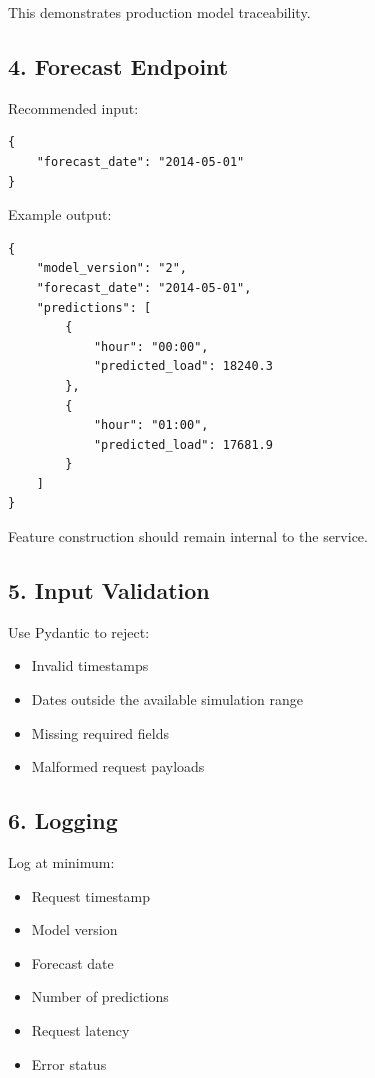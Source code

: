 \documentclass[11pt,a4paper]{article}
\begin{document}
This demonstrates production model traceability.

\subsection{4. Forecast Endpoint}

Recommended input:

\begin{lstlisting}
{
    "forecast_date": "2014-05-01"
}
\end{lstlisting}

Example output:

\begin{lstlisting}
{
    "model_version": "2",
    "forecast_date": "2014-05-01",
    "predictions": [
        {
            "hour": "00:00",
            "predicted_load": 18240.3
        },
        {
            "hour": "01:00",
            "predicted_load": 17681.9
        }
    ]
}
\end{lstlisting}

Feature construction should remain internal to the service.

\subsection{5. Input Validation}

Use Pydantic to reject:

\begin{itemize}
    \item Invalid timestamps
    \item Dates outside the available simulation range
    \item Missing required fields
    \item Malformed request payloads
\end{itemize}

\subsection{6. Logging}

Log at minimum:

\begin{itemize}
    \item Request timestamp
    \item Model version
    \item Forecast date
    \item Number of predictions
    \item Request latency
    \item Error status
\end{itemize}
\end{document}
